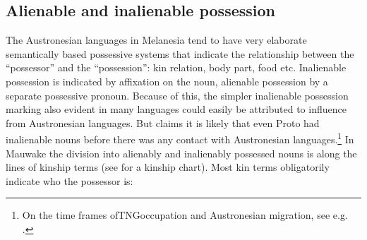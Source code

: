 \subsection{Alienable and inalienable possession}\label{sec:3.2.4}
{}
The Austronesian languages in Melanesia tend to have very elaborate semantically based possessive systems that indicate the relationship between the ``possessor'' and the ``possession'': kin relation, body part, food etc. Inalienable possession is indicated by affixation on the noun, alienable possession by a separate possessive pronoun. Because of this, the simpler inalienable possession marking also evident in many  languages could easily be attributed to influence from Austronesian languages. But \citet[28]{Ross1996} claims it is likely that even Proto  had inalienable nouns before there was any contact with Austronesian languages.\footnote{On the time frames of\textsc{TNG}occupation and Austronesian migration, see e.g. \citet[39--41]{Ross2005}.} In Mauwake the division into alienably and inalienably possessed nouns is along the lines of kinship terms (see  for a kinship chart). Most kin terms obligatorily indicate who the {\textquotedbl}possessor{\textquotedbl} is:

